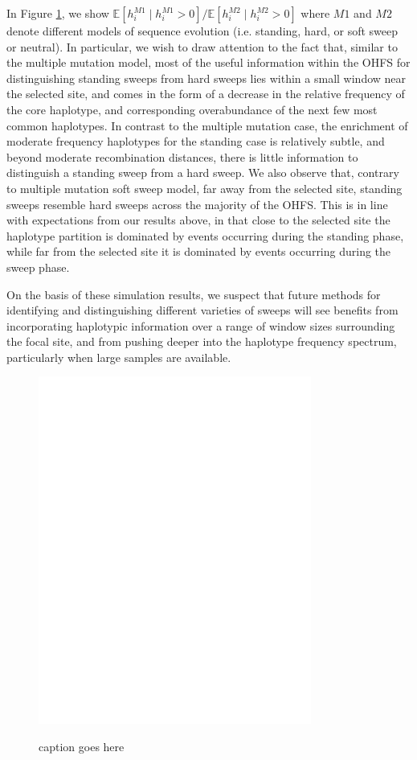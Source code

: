 \documentclass[a4paper,10pt]{article}
\begin{document}
In Figure \ref{hap-freq-ratios}, we show $\mathbb{E}[h_i^{M1} \mid h_i^{M1} > 0]/\mathbb{E}[h_i^{M2} \mid h_i^{M2} > 0]$ where $M1$ and $M2$ denote different models of sequence evolution (i.e. standing, hard, or soft sweep or neutral). In particular, we wish to draw attention to the fact that, similar to the multiple mutation model, most of the useful information within the OHFS for distinguishing standing sweeps from hard sweeps lies within a small window near the selected site, and comes in the form of a decrease in the relative frequency of the core haplotype, and corresponding overabundance of the next few most common haplotypes. In contrast to the multiple mutation case, the enrichment of moderate frequency haplotypes for the standing case is relatively subtle, and beyond moderate recombination distances, there is little information to distinguish a standing sweep from a hard sweep. We also observe that, contrary to multiple mutation soft sweep model, far away from the selected site, standing sweeps resemble hard sweeps across the majority of the OHFS. This is in line with expectations from our results above, in that close to the selected site the haplotype partition is dominated by events occurring during the standing phase, while far from the selected site it is dominated by events occurring during the sweep phase.

On the basis of these simulation results, we suspect that future methods for identifying and distinguishing different varieties of sweeps will see benefits from incorporating haplotypic information over a range of window sizes surrounding the focal site, and from pushing deeper into the haplotype frequency spectrum, particularly when large samples are available. 

\begin{figure}
	\includegraphics[width = 0.8\textwidth]{../Paper_Figures/HapFreqRatiosCondExist.pdf} \label{hap-freq-ratios}
	\caption{caption goes here}
\end{figure}
\end{document}
